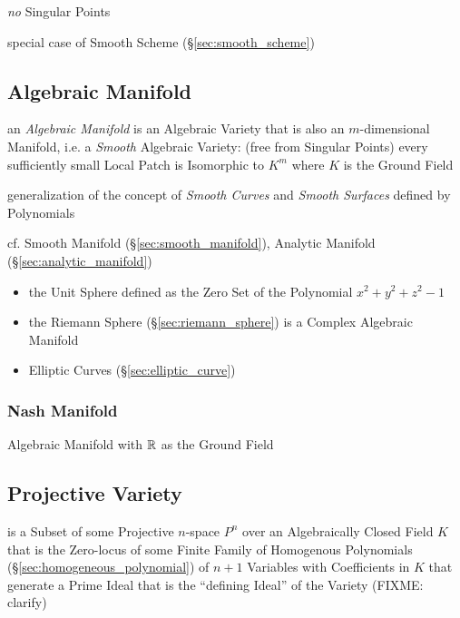 \emph{no} Singular Points

special case of Smooth Scheme (\S\ref{sec:smooth_scheme})



\subsection{Algebraic Manifold}\label{sec:algebraic_manifold}

an \emph{Algebraic Manifold} is an Algebraic Variety that is also an
$m$-dimensional Manifold, i.e. a \emph{Smooth} Algebraic Variety:
(free from Singular Points) every sufficiently small Local Patch is Isomorphic
to $K^m$ where $K$ is the Ground Field

generalization of the concept of \emph{Smooth Curves} and \emph{Smooth
  Surfaces} defined by Polynomials

cf. Smooth Manifold (\S\ref{sec:smooth_manifold}), Analytic Manifold
(\S\ref{sec:analytic_manifold})

\begin{itemize}
  \item the Unit Sphere defined as the Zero Set of the Polynomial
    $x^2 + y^2 + z^2 - 1$
  \item the Riemann Sphere (\S\ref{sec:riemann_sphere}) is a Complex Algebraic
    Manifold
  \item Elliptic Curves (\S\ref{sec:elliptic_curve})
\end{itemize}



\subsubsection{Nash Manifold}\label{sec:nash_manifold}

Algebraic Manifold with $\mathbb{R}$ as the Ground Field



\subsection{Projective Variety}\label{sec:projective_variety}

is a Subset of some Projective $n$-space $\xspace{P}^n$ over an Algebraically
Closed Field $K$ that is the Zero-locus of some Finite Family of Homogenous
Polynomials (\S\ref{sec:homogeneous_polynomial}) of $n + 1$ Variables with
Coefficients in $K$ that generate a Prime Ideal that is the ``defining Ideal''
of the Variety (FIXME: clarify)

